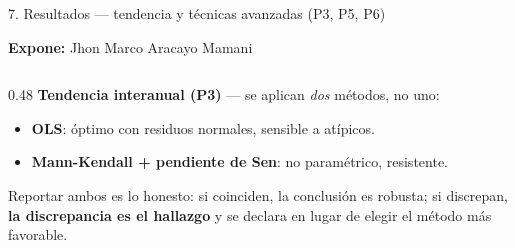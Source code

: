 \documentclass[aspectratio=169,11pt]{beamer}
\newcommand{\ponente}[1]{%
  \begin{flushright}\tiny\textcolor{pnBrandDark}{\textbf{Expone:} #1}\end{flushright}%
  \vspace{-0.9em}%
}
\begin{document}
\begin{frame}{7. Resultados — tendencia y técnicas avanzadas (P3, P5, P6)}
  \ponente{Jhon Marco Aracayo Mamani}
  \scriptsize
  \begin{columns}[T]
    \begin{column}{0.48\textwidth}
      \textbf{Tendencia interanual (P3)} — se aplican \emph{dos} métodos, no uno:
      \begin{itemize}\itemsep0.15em
        \item \textbf{OLS}: óptimo con residuos normales, sensible a atípicos.
        \item \textbf{Mann-Kendall + pendiente de Sen}: no paramétrico, resistente.
      \end{itemize}
      \vspace{0.25em}
      Reportar ambos es lo honesto: si coinciden, la conclusión es robusta; si discrepan,
      \textbf{la discrepancia es el hallazgo} y se declara en lugar de elegir el método más favorable.


\end{column}
\end{columns}
\end{frame}
\end{document}
